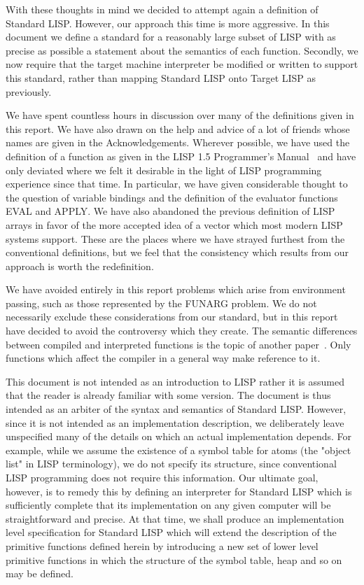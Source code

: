 With these thoughts in mind we decided to attempt again a definition
of Standard LISP. However, our approach this time is more aggressive.
In this document we define a standard for a reasonably large subset of
LISP with as precise as possible a statement about the semantics of
each function. Secondly, we now require that the target machine
interpreter be modified or written to support this standard, rather
than mapping Standard LISP onto Target LISP as previously.

We have spent countless hours in discussion over many of the
definitions given in this report. We have also drawn on the help and
advice of a lot of friends whose names are given in the
Acknowledgements. Wherever possible, we have used the definition of a
function as given in the LISP 1.5 Programmer's Manual~\cite{LISP1.5}
and have only deviated where we felt it desirable in the light of LISP
programming experience since that time. In particular, we have given
considerable thought to the question of variable bindings and the
definition of the evaluator functions EVAL and APPLY. We have also
abandoned the previous definition of LISP arrays in favor of the more
accepted idea of a vector which most modern LISP systems support.
These are the places where we have strayed furthest from the
conventional definitions, but we feel that the consistency which
results from our approach is worth the redefinition.

We have avoided entirely in this report problems which arise from
environment passing, such as those represented by the FUNARG problem.
We do not necessarily exclude these considerations from our standard,
but in this report have decided to avoid the controversy which they
create. The semantic differences between compiled and interpreted
functions is the topic of another paper~\cite{PLC}. Only functions
which affect the compiler in a general way make reference to it.

This document is not intended as an introduction to LISP rather it is
assumed that the reader is already familiar with some version.  The
document is thus intended as an arbiter of the syntax and semantics of
Standard LISP. However, since it is not intended as an implementation
description, we deliberately leave unspecified many of the details on
which an actual implementation depends. For example, while we assume
the existence of a symbol table for atoms (the "object list" in LISP
terminology), we do not specify its structure, since conventional LISP
programming does not require this information. Our ultimate goal,
however, is to remedy this by defining an interpreter for Standard
LISP which is sufficiently complete that its implementation on any
given computer will be straightforward and precise. At that time, we
shall produce an implementation level specification for Standard LISP
which will extend the description of the primitive functions defined
herein by introducing a new set of lower level primitive functions in
which the structure of the symbol table, heap and so on may be
defined.

